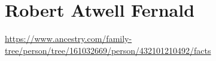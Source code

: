 \section{Robert Atwell Fernald}

\url{https://www.ancestry.com/family-tree/person/tree/161032669/person/432101210492/facts}